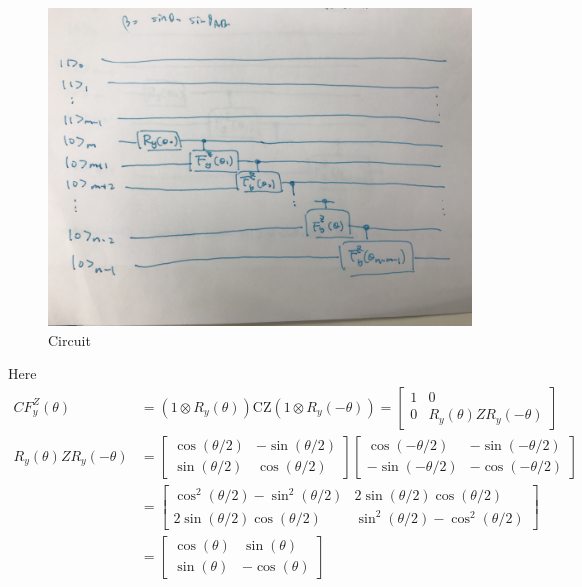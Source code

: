 \documentclass[11pt, oneside]{article}   	%
\begin{document}
\begin{figure}
\includegraphics[width=\linewidth]{figs/cis_circuit_01}
\caption{Circuit}
\label{fig:cis}
\end{figure}

Here 
\begin{align}
CF^Z_y(\theta) &= (1 \otimes R_y(\theta)) \mathrm{CZ} (1 \otimes R_y(-\theta)) = 
\begin{bmatrix}
1 & 0 \\
0 & R_y(\theta) Z R_y(-\theta)
\end{bmatrix} \\
R_y(\theta) Z R_y(-\theta) &= 
\begin{bmatrix}
\cos(\theta/2) & -\sin(\theta/2) \\
\sin(\theta/2) & \cos(\theta/2)
\end{bmatrix} 
\begin{bmatrix}
\cos(-\theta/2) & -\sin(-\theta/2) \\
-\sin(-\theta/2) & -\cos(-\theta/2)
\end{bmatrix} \\
&=
\begin{bmatrix}
\cos^2(\theta/2) - \sin^2(\theta/2) & 2 \sin(\theta/2) \cos(\theta/2) \\
2 \sin(\theta/2) \cos(\theta/2) & \sin^2(\theta/2) - \cos^2(\theta/2)
\end{bmatrix} \\
&=
\begin{bmatrix}
\cos(\theta) & \sin(\theta) \\
\sin(\theta) & -\cos(\theta)
\end{bmatrix}
\end{align}
\end{document}
